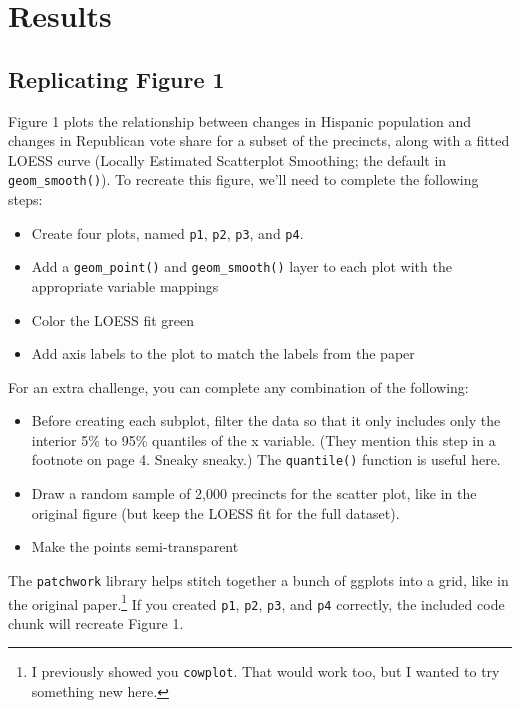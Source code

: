 \documentclass[12pt,halfline,a4paper,]{ouparticle}
\providecommand{\tightlist}{%
  \setlength{\itemsep}{0pt}\setlength{\parskip}{0pt}}
\begin{document}
\hypertarget{results}{%
\section{Results}\label{results}}

\hypertarget{replicating-figure-1}{%
\subsection{Replicating Figure 1}\label{replicating-figure-1}}

Figure 1 plots the relationship between changes in Hispanic population
and changes in Republican vote share for a subset of the precincts,
along with a fitted LOESS curve (Locally Estimated Scatterplot
Smoothing; the default in \texttt{geom\_smooth()}). To recreate this
figure, we'll need to complete the following steps:

\begin{itemize}
\tightlist
\item
  Create four plots, named \texttt{p1}, \texttt{p2}, \texttt{p3}, and
  \texttt{p4}.
\item
  Add a \texttt{geom\_point()} and \texttt{geom\_smooth()} layer to each
  plot with the appropriate variable mappings
\item
  Color the LOESS fit green
\item
  Add axis labels to the plot to match the labels from the paper
\end{itemize}

\noindent For an extra challenge, you can complete any combination of
the following:

\begin{itemize}
\tightlist
\item
  Before creating each subplot, filter the data so that it only includes
  only the interior 5\% to 95\% quantiles of the x variable. (They
  mention this step in a footnote on page 4. Sneaky sneaky.) The
  \texttt{quantile()} function is useful here.
\item
  Draw a random sample of 2,000 precincts for the scatter plot, like in
  the original figure (but keep the LOESS fit for the full dataset).
\item
  Make the points semi-transparent
\end{itemize}

The \texttt{patchwork} library helps stitch together a bunch of ggplots
into a grid, like in the original paper.\footnote{I previously showed
  you \texttt{cowplot}. That would work too, but I wanted to try
  something new here.} If you created \texttt{p1}, \texttt{p2},
\texttt{p3}, and \texttt{p4} correctly, the included code chunk will
recreate Figure 1.
\end{document}
